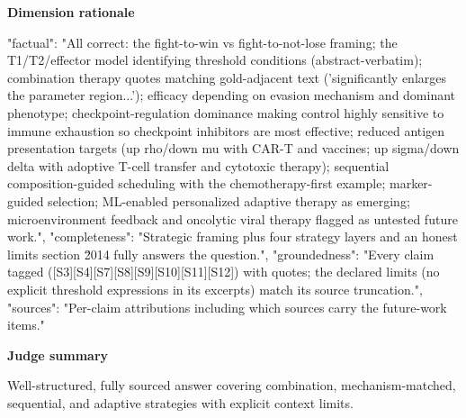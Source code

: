 \documentclass[10pt]{article}
\begin{document}
\textbf{Dimension rationale}
\begin{EvidenceText}
{
  "factual": "All correct: the fight-to-win vs fight-to-not-lose framing; the T1/T2/effector model identifying threshold conditions (abstract-verbatim); combination therapy quotes matching gold-adjacent text ('significantly enlarges the parameter region...'); efficacy depending on evasion mechanism and dominant phenotype; checkpoint-regulation dominance making control highly sensitive to immune exhaustion so checkpoint inhibitors are most effective; reduced antigen presentation targets (up rho/down mu with CAR-T and vaccines; up sigma/down delta with adoptive T-cell transfer and cytotoxic therapy); sequential composition-guided scheduling with the chemotherapy-first example; marker-guided selection; ML-enabled personalized adaptive therapy as emerging; microenvironment feedback and oncolytic viral therapy flagged as untested future work.",
  "completeness": "Strategic framing plus four strategy layers and an honest limits section \u2014 fully answers the question.",
  "groundedness": "Every claim tagged ([S3][S4][S7][S8][S9][S10][S11][S12]) with quotes; the declared limits (no explicit threshold expressions in its excerpts) match its source truncation.",
  "sources": "Per-claim attributions including which sources carry the future-work items."
}
\end{EvidenceText}

\textbf{Judge summary}
\begin{EvidenceText}
Well-structured, fully sourced answer covering combination, mechanism-matched, sequential, and adaptive strategies with explicit context limits.
\end{EvidenceText}
\end{document}
